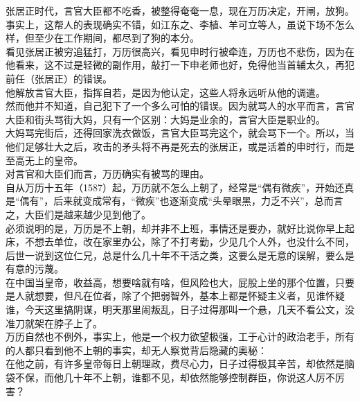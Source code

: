 \begin{multicols}{\theparacolNo}
张居正时代，言官大臣都不吃香，被整得奄奄一息，现在万历决定，开闸，放狗。\\

事实上，这帮人的表现确实不错，如江东之、李植、羊可立等人，虽说下场不怎么样，但至少在工作期间，都尽到了狗的本分。\\

看见张居正被穷追猛打，万历很高兴，看见申时行被牵连，万历也不悲伤，因为在他看来，这不过是轻微的副作用，敲打一下申老师也好，免得他当首辅太久，再犯前任（张居正）的错误。\\

他解放言官大臣，指挥自若，是因为他认定，这些人将永远听从他的调遣。\\

然而他并不知道，自己犯下了一个多么可怕的错误。因为就骂人的水平而言，言官大臣和街头骂街大妈，只有一个区别：大妈是业余的，言官大臣是职业的。\\

大妈骂完街后，还得回家洗衣做饭，言官大臣骂完这个，就会骂下一个。所以，当他们足够壮大之后，攻击的矛头将不再是死去的张居正，或是活着的申时行，而是至高无上的皇帝。\\

对言官和大臣们而言，万历确实有被骂的理由。\\

自从万历十五年（1587）起，万历就不怎么上朝了，经常是“偶有微疾”，开始还真是“偶有”，后来就变成常有，“微疾”也逐渐变成“头晕眼黑，力乏不兴”，总而言之，大臣们是越来越少见到他了。\\

必须说明的是，万历是不上朝，却并非不上班，事情还是要办，就好比说你早上起床，不想去单位，改在家里办公，除了不打考勤，少见几个人外，也没什么不同，后世一说到这位仁兄，总是什么几十年不干活之类，这要么是无意的误解，要么是有意的污蔑。\\

在中国当皇帝，收益高，想要啥就有啥，但风险也大，屁股上坐的那个位置，只要是人就想要，但凡在位者，除了个把弱智外，基本上都是怀疑主义者，见谁怀疑谁，今天这里搞阴谋，明天那里闹叛乱，日子过得那叫一个悬，几天不看公文，没准刀就架在脖子上了。\\

万历自然也不例外，事实上，他是一个权力欲望极强，工于心计的政治老手，所有的人都只看到他不上朝的事实，却无人察觉背后隐藏的奥秘：\\

在他之前，有许多皇帝每日上朝理政，费尽心力，日子过得极其辛苦，却依然是脑袋不保，而他几十年不上朝，谁都不见，却依然能够控制群臣，你说这人厉不厉害？\\


\end{multicols}
